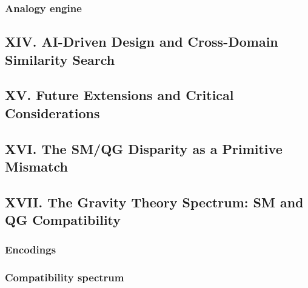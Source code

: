 \documentclass{article[11pt,letterpaper]}
\begin{document}

\subsubsection{Analogy engine}
\label{sec:analogy-engine}


\subsection{XIV. AI-Driven Design and Cross-Domain Similarity Search}
\label{sec:xiv-ai-driven-design-and-cross-domain-similarity-s}


\subsection{XV. Future Extensions and Critical Considerations}
\label{sec:xv-future-extensions-and-critical-considerations}


\subsection{XVI. The SM/QG Disparity as a Primitive Mismatch}
\label{sec:xvi-the-smqg-disparity-as-a-primitive-mismatch}


\subsection{XVII. The Gravity Theory Spectrum: SM and QG Compatibility}
\label{sec:xvii-the-gravity-theory-spectrum-sm-and-qg-compati}


\subsubsection{Encodings}
\label{sec:encodings}


\subsubsection{Compatibility spectrum}
\label{sec:compatibility-spectrum}
\end{document}
